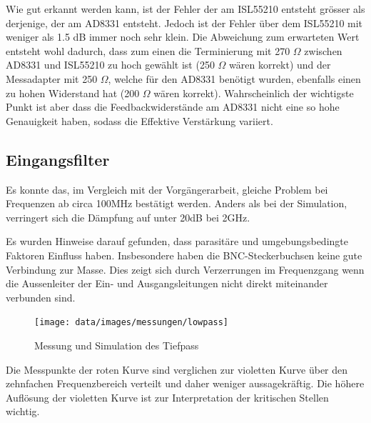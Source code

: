 Wie gut erkannt werden kann, ist der Fehler der am ISL55210 entsteht grösser als derjenige, der am AD8331 entsteht. Jedoch ist der Fehler über dem ISL55210 mit weniger als 1.5 dB immer noch sehr klein. Die Abweichung zum erwarteten Wert entsteht wohl dadurch, dass zum einen die Terminierung mit 270 $\Omega$ zwischen AD8331 und ISL55210 zu hoch gewählt ist (250 $\Omega$ wären korrekt) und der Messadapter mit 250 $\Omega$, welche für den AD8331 benötigt wurden, ebenfalls einen zu hohen Widerstand hat (200 $\Omega$ wären korrekt). Wahrscheinlich der wichtigste Punkt ist aber dass die Feedbackwiderstände am AD8331 nicht eine so hohe Genauigkeit haben, sodass die Effektive Verstärkung variiert.

\subsection{Eingangsfilter}
Es konnte das, im Vergleich mit der Vorgängerarbeit, gleiche Problem bei Frequenzen ab circa 100MHz bestätigt werden. Anders als bei der Simulation, verringert sich die Dämpfung auf unter 20dB bei 2GHz.

Es wurden Hinweise darauf gefunden, dass parasitäre und umgebungsbedingte Faktoren Einfluss haben. Insbesondere haben die BNC-Steckerbuchsen keine gute Verbindung zur Masse. Dies zeigt sich durch Verzerrungen im Frequenzgang wenn die Aussenleiter der Ein- und Ausgangsleitungen nicht direkt miteinander verbunden sind.

\begin{figure}[H]
	\begin{center}
		\texttt{[image: data/images/messungen/lowpass]}
		\caption{Messung und Simulation des Tiefpass}
		\label{fig:lowpass-plot}
	\end{center}
\end{figure}

Die Messpunkte der roten Kurve sind verglichen zur violetten Kurve über den zehnfachen Frequenzbereich verteilt und daher weniger aussagekräftig. Die höhere Auflösung der violetten Kurve ist zur Interpretation der kritischen Stellen wichtig.
